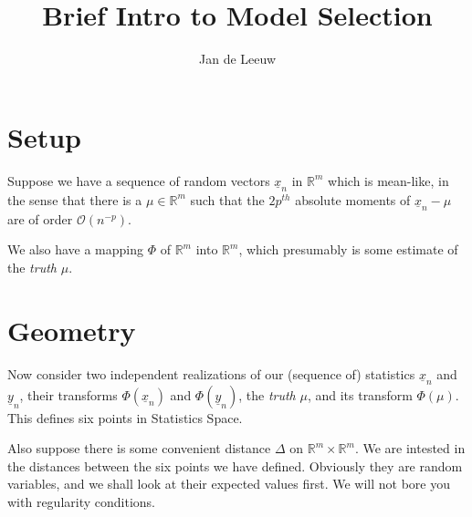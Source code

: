 \documentclass[12pt]{amsart}
\begin{document}
\title{Brief Intro to Model Selection}
\author{Jan de Leeuw}
\address{UCLA Statistics Program, 405 Hilgard Avenue,
Los Angeles, CA 90095}
\maketitle
%
\section{Setup}
%
Suppose we have a sequence of random vectors
$\underline{x}_n$ in $\mathbb{R}^m$ which
is mean-like, in the sense that there is a 
$\mu\in\mathbb{R}^m$ such that the $2p^{th}$ absolute moments
of $\underline{x}_n-\mu$ are of order
$\mathcal{O}(n^{-p}).$\par
%
We also have a mapping $\Phi$ of $\mathbb{R}^m$
into $\mathbb{R}^m$, which presumably is some
estimate of the \emph{truth} $\mu$.\par
%
\section{Geometry}
%
Now consider two independent realizations of our
(sequence of) statistics
$\underline{x}_n$ and $\underline{y}_n$, their
transforms $\Phi(\underline{x}_n)$
and $\Phi(\underline{y}_n)$, the \emph{truth} $\mu$,
and its transform $\Phi(\mu)$. This defines
six points in Statistics Space.\par
%
Also suppose there is some convenient distance 
$\Delta$ on $\mathbb{R}^m\times\mathbb{R}^m$.
We are intested in the distances between the
six points we have defined. Obviously they are
random variables, and we shall look at their
expected values first. We will not bore you
with regularity conditions.\par
%
\end{document}
